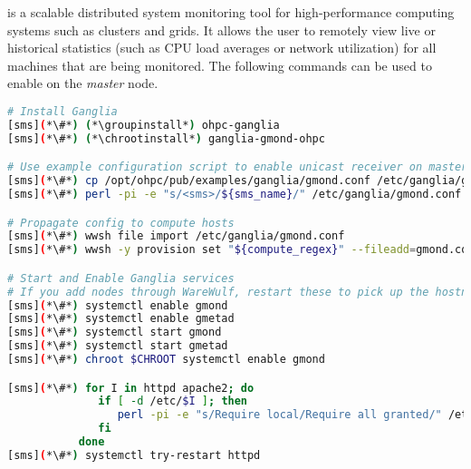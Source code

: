 \Ganglia{} is a scalable distributed system monitoring tool for high-performance
computing systems such as clusters and grids. It allows the user to remotely
view live or historical statistics (such as CPU load averages or network
utilization) for all machines that are being monitored. The following commands
can be used to enable \Ganglia{} on the {\em master} node.

\begin{lstlisting}[language=bash,keywords={},upquote=true]
# Install Ganglia
[sms](*\#*) (*\groupinstall*) ohpc-ganglia
[sms](*\#*) (*\chrootinstall*) ganglia-gmond-ohpc

# Use example configuration script to enable unicast receiver on master host
[sms](*\#*) cp /opt/ohpc/pub/examples/ganglia/gmond.conf /etc/ganglia/gmond.conf
[sms](*\#*) perl -pi -e "s/<sms>/${sms_name}/" /etc/ganglia/gmond.conf

# Propagate config to compute hosts
[sms](*\#*) wwsh file import /etc/ganglia/gmond.conf
[sms](*\#*) wwsh -y provision set "${compute_regex}" --fileadd=gmond.conf

# Start and Enable Ganglia services
# If you add nodes through WareWulf, restart these to pick up the hostnames rather than the IPs
[sms](*\#*) systemctl enable gmond
[sms](*\#*) systemctl enable gmetad
[sms](*\#*) systemctl start gmond
[sms](*\#*) systemctl start gmetad
[sms](*\#*) chroot $CHROOT systemctl enable gmond

[sms](*\#*) for I in httpd apache2; do
              if [ -d /etc/$I ]; then
                 perl -pi -e "s/Require local/Require all granted/" /etc/$I/conf.d/ganglia-ohpc.conf
              fi
           done 
[sms](*\#*) systemctl try-restart httpd
\end{lstlisting}

